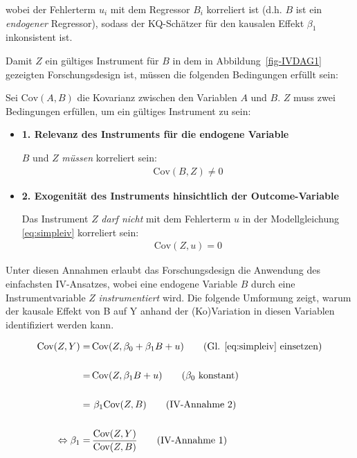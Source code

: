 \documentclass[
  a4paper,
  DIV=11,
  oneside]{scrreprt}
\begin{document}
wobei der Fehlerterm \(u_i\) mit dem Regressor \(B_i\) korreliert ist
(d.h. \(B\) ist ein \emph{endogener} Regressor), sodass der KQ-Schätzer
für den kausalen Effekt \(\beta_1\) inkonsistent ist.

Damit \(Z\) ein gültiges Instrument für \(B\) in dem in
Abbildung~\ref{fig-IVDAG1} gezeigten Forschungsdesign ist, müssen die
folgenden Bedingungen erfüllt sein:

Sei \(\text{Cov}(A,B)\) die Kovarianz zwischen den Variablen \(A\) und
\(B\). \(Z\) muss zwei Bedingungen erfüllen, um ein gültiges Instrument
zu sein:

\begin{itemize}
\item
  \textbf{1. Relevanz des Instruments für die endogene Variable}

  \(B\) und \(Z\) \emph{müssen} korreliert sein: \begin{align}
      \text{Cov}(B,Z) \neq 0 \label{eq:ivassum1}
    \end{align}
\item
  \textbf{2. Exogenität des Instruments hinsichtlich der
  Outcome-Variable}

  Das Instrument \(Z\) \emph{darf nicht} mit dem Fehlerterm \(u\) in der
  Modellgleichung \eqref{eq:simpleiv} korreliert sein: \begin{align}
      \text{Cov}(Z,u) = 0 \label{eq:ivassum2}
    \end{align}
\end{itemize}

Unter diesen Annahmen erlaubt das Forschungsdesign die Anwendung des
einfachsten IV-Ansatzes, wobei eine endogene Variable \(B\) durch eine
Instrumentvariable \(Z\) \emph{instrumentiert} wird. Die folgende
Umformung zeigt, warum der kausale Effekt von B auf Y anhand der
(Ko)Variation in diesen Variablen identifiziert werden kann.

\begin{align}
  \textup{Cov}(Z,Y) = &\, \textup{Cov}(Z,\beta_0 + \beta_1 B + u) \tag{Gl. \eqref{eq:simpleiv} einsetzen} \\
  \notag\\
  =&\, \textup{Cov}(Z, \beta_1 B + u) \tag{$\beta_0$ konstant} \\
  \notag\\
  =&\,\, \beta_1\textup{Cov}(Z,B) \tag{IV-Annahme 2} \\
  \notag\\
  \Leftrightarrow \beta_1 =&\, \frac{\textup{Cov}(Z,Y) }{\textup{Cov}(Z,B)} \tag{IV-Annahme 1}
\end{align}
\end{document}
